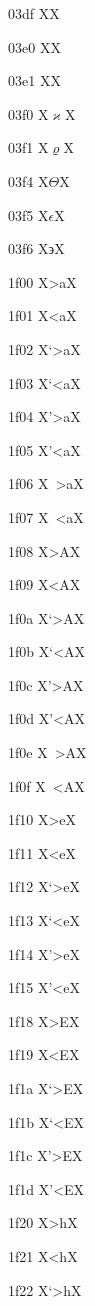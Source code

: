 \documentclass[11pt]{article}
\begin{document}
03df X{\textgreek{\koppa}}X

03e0 X{\textgreek{\Sampi}}X

03e1 X{\textgreek{\sampi}}X

03f0 X{\ensuremath{\varkappa}}X

03f1 X{\ensuremath{\varrho}}X

03f4 X{\ensuremath{\Theta}}X

03f5 X{\ensuremath{\epsilon}}X

03f6 X{\ensuremath{\backepsilon}}X

1f00 X{\textgreek{>a}}X

1f01 X{\textgreek{<a}}X

1f02 X{\textgreek{`>a}}X

1f03 X{\textgreek{`<a}}X

1f04 X{\textgreek{'>a}}X

1f05 X{\textgreek{'<a}}X

1f06 X{\textgreek{~>a}}X

1f07 X{\textgreek{~<a}}X

1f08 X{\textgreek{>A}}X

1f09 X{\textgreek{<A}}X

1f0a X{\textgreek{`>A}}X

1f0b X{\textgreek{`<A}}X

1f0c X{\textgreek{'>A}}X

1f0d X{\textgreek{'<A}}X

1f0e X{\textgreek{~>A}}X

1f0f X{\textgreek{~<A}}X

1f10 X{\textgreek{>e}}X

1f11 X{\textgreek{<e}}X

1f12 X{\textgreek{`>e}}X

1f13 X{\textgreek{`<e}}X

1f14 X{\textgreek{'>e}}X

1f15 X{\textgreek{'<e}}X

1f18 X{\textgreek{>E}}X

1f19 X{\textgreek{<E}}X

1f1a X{\textgreek{`>E}}X

1f1b X{\textgreek{`<E}}X

1f1c X{\textgreek{'>E}}X

1f1d X{\textgreek{'<E}}X

1f20 X{\textgreek{>h}}X

1f21 X{\textgreek{<h}}X

1f22 X{\textgreek{`>h}}X
\end{document}
